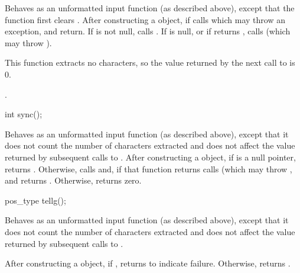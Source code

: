 \begin{itemdescr}
\pnum
\effects
Behaves as an unformatted input function (as described above), except that the function first clears .
After constructing
a  object, if
calls
which may throw an exception,
and return.
If
is not null, calls
.
If
is null, or if
returns
,
calls
(which may throw
).
\begin{note}
This
function extracts no characters, so the value returned by the next call to
is 0.
\end{note}

\pnum
\returns
{}.
\end{itemdescr}

%
\begin{itemdecl}
int sync();
\end{itemdecl}

\begin{itemdescr}
\pnum
\effects
Behaves as an unformatted input function (as described above), except that it does not
count the number of characters extracted and does not affect the
value returned by subsequent calls to
.
After constructing
a  object, if
is a null pointer, returns .
Otherwise, calls
and, if that function returns 
calls
(which may throw
,
and returns
.
Otherwise, returns zero.
\end{itemdescr}

%
\begin{itemdecl}
pos_type tellg();
\end{itemdecl}

\begin{itemdescr}
\pnum
\effects
Behaves as an unformatted input function (as described above), except that it does not count
the number of characters extracted and does not affect the value
returned by subsequent calls to
.

\pnum
\returns
After constructing a  object, if
,
returns
to indicate failure.
Otherwise, returns
.
\end{itemdescr}

